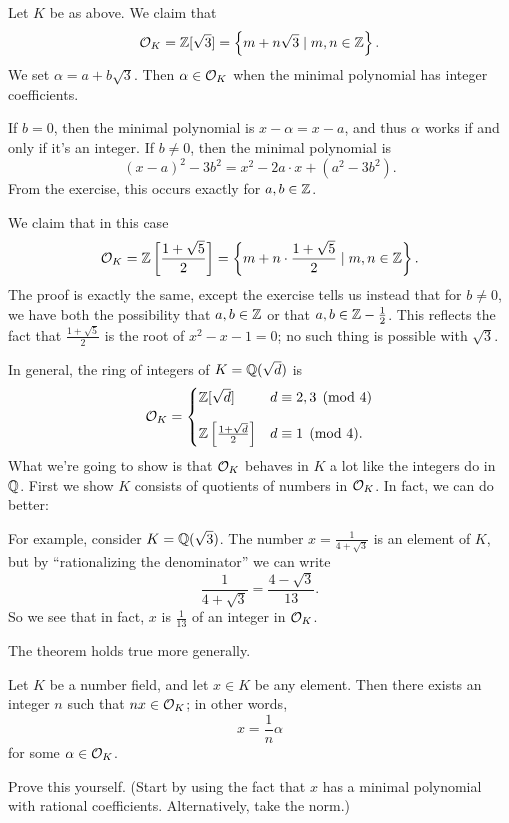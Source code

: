 \begin{example}
	[Ring of integers of $K = \QQ(\sqrt3)$]
	Let $K$ be as above.
	We claim that \[ \mathcal O_K = \mathbb Z[\sqrt 3] = \left\{ m + n\sqrt 3 \mid m,n \in \mathbb Z  \right\}. \]
	We set $\alpha = a + b \sqrt 3$.
	Then $\alpha \in \mathcal O_K$ when the minimal polynomial has integer coefficients.

	If $b = 0$, then the minimal polynomial is $x-\alpha=x-a$,
	and thus $\alpha$ works if and only if it's an integer.
	If $b \neq 0$, then the minimal polynomial is
	\[ (x-a)^2 - 3b^2 = x^2 - 2a \cdot x + (a^2-3b^2). \]
	From the exercise, this occurs exactly for $a,b \in \mathbb Z$.
\end{example}
\begin{example}
	[Ring of integers of $K = \QQ(\sqrt 5)$]
	We claim that in this case
	\[ \mathcal O_K = \mathbb Z\left[ \frac{1+\sqrt5}{2} \right]
	= \left\{ m + n \cdot \frac{1+\sqrt5}{2} \mid m,n \in \mathbb Z \right\}. \]
	The proof is exactly the same, except the exercise tells us instead
	that for $b \neq 0$, we have both the possibility that $a,b \in \mathbb Z$
	or that $a,b \in \mathbb Z - \frac{1}{2}$.
	This reflects the fact that $\frac{1+\sqrt5}{2}$ is the root of $x^2-x-1 = 0$;
	no such thing is possible with $\sqrt 3$.
\end{example}
In general, the ring of integers of $K = \mathbb Q(\sqrt d)$ is
\[ \mathcal O_K
	=
	\begin{cases}
		\mathbb Z[\sqrt d] & d\equiv 2,3 \pmod 4 \\[1em]
		\mathbb Z\left[ \frac{1+\sqrt d}{2} \right] & d \equiv 1 \pmod 4.
	\end{cases}
\]
What we're going to show is that $\mathcal O_K$ behaves in $K$
a lot like the integers do in $\mathbb Q$.
First we show $K$ consists of quotients of numbers in $\mathcal O_K$.
In fact, we can do better:
\begin{example}
	For example, consider $K = \QQ(\sqrt3)$.
	The number $x = \frac{1}{4+\sqrt3}$ is an element of $K$, but by
	``rationalizing the denominator'' we can write
	\[ \frac{1}{4+\sqrt3} = \frac{4-\sqrt3}{13}. \]
	So we see that in fact, $x$ is $\frac{1}{13}$ of an integer in $\mathcal O_K$.
\end{example}

The theorem holds true more generally.
\begin{theorem}[$K = \QQ \cdot \OO_K$]
	Let $K$ be a number field, and let $x \in K$ be any element.
	Then there exists an integer $n$ such that $nx \in \mathcal O_K$;
	in other words, \[ x = \frac 1n \alpha \] for some $\alpha \in \mathcal O_K$.
\end{theorem}
\begin{exercise}
	Prove this yourself.
	(Start by using the fact that $x$ has a minimal
	polynomial with rational coefficients.
	Alternatively, take the norm.)
\end{exercise}

